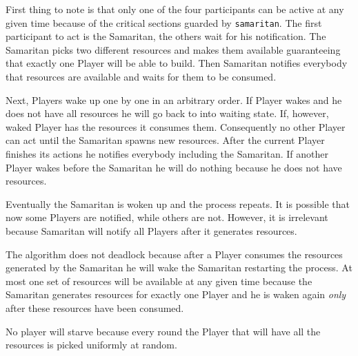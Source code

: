 \documentclass[12pt]{article}
\begin{document}
First thing to note is that only one of the four participants can be
active at any given time because of the critical sections guarded by
\texttt{samaritan}. The first participant to act is the Samaritan, the others
wait for his notification. The Samaritan picks two different resources and
makes them available guaranteeing that exactly one Player will be able to
build. Then Samaritan notifies everybody that resources are available and
waits for them to be consumed.

Next, Players wake up one by one in an arbitrary order. If Player wakes and
he does not have all resources he will go back to into waiting state.  If,
however, waked Player has the resources it consumes them. Consequently no other
Player can act until the Samaritan spawns new resources. After the current
Player finishes its actions he notifies everybody including the Samaritan.
If another Player wakes before the Samaritan he will do nothing because he
does not have resources.

Eventually the Samaritan is woken up and the process repeats. It is possible
that now some Players are notified, while others are not. However, it is
irrelevant because Samaritan will notify all Players after it generates
resources.

The algorithm does not deadlock because after a Player consumes the resources
generated by the Samaritan he will wake the Samaritan restarting the
process. At most one set of resources will be available at any
given time because the Samaritan generates resources for exactly one Player
and he is waken again \emph{only} after these resources have been consumed.

No player will starve because every round the Player that will have all the
resources is picked uniformly at random.
\end{document}
